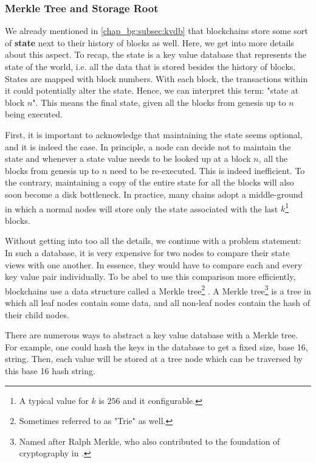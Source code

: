 \subsubsection{Merkle Tree and Storage Root} \label{chap_bg:subsec:trie}

We already mentioned in \ref{chap_bg:subsec:kvdb} that blockchains store some sort of \textbf{state}
next to their history of blocks as well. Here, we get into more details about this aspect. To recap,
the state is a key value database that represents the state of the world, i.e. all the data that is
stored besides the history of blocks. States are mapped with block numbers. With each block, the
transactions within it could potentially alter the state. Hence, we can interpret this term: "state
at block $n$". This means the final state, given all the blocks from genesis up to $n$ being
executed.

First, it is important to acknowledge that maintaining the state seems optional, and it is indeed
the case. In principle, a node can decide not to maintain the state and whenever a state value needs
to be looked up at a block $n$, all the blocks from genesis up to $n$ need to be re-executed. This
is indeed inefficient. To the contrary, maintaining a copy of the entire state for all the blocks
will also soon become a disk bottleneck. In practice, many chains adopt a middle-ground in which a
normal nodes will store only the state associated with the last $k$\footnote{A typical value for $k$
is $256$ and it configurable.} blocks.

Without getting into too all the details, we continue with a problem statement: In such a database,
it is very expensive for two nodes to compare their state views with one another. In essence, they
would have to compare each and every key value pair individually. To be abel to use this comparison
more efficiently, blockchains use a data structure called a Merkle tree\footnote{Sometimes referred
to as "Trie" as well.} \cite{Merkle_1988_tree}. A Merkle tree\footnote{Named after Ralph Merkle, who
also contributed to the foundation of cryptography in \cite{Merkle_1978}.} is a tree in which all
leaf nodes contain some data, and all non-leaf nodes contain the hash of their child nodes.

There are numerous ways to abstract a key value database with a Merkle tree. For example, one could
hash the keys in the database to get a fixed size, base 16, string. Then, each value will be stored
at a tree node which can be traversed by this base 16 hash string.

